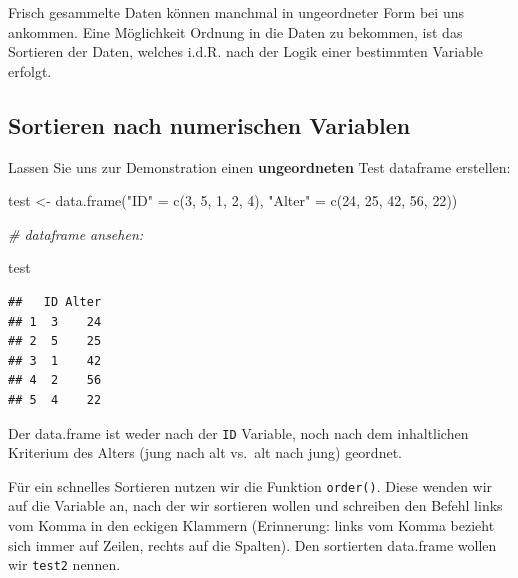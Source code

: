 \documentclass[
]{book}
\newenvironment{Shaded}{\begin{snugshade}}{\end{snugshade}}
\newcommand{\CommentTok}[1]{\textcolor[rgb]{0.56,0.35,0.01}{\textit{#1}}}
\newcommand{\DecValTok}[1]{\textcolor[rgb]{0.00,0.00,0.81}{#1}}
\newcommand{\FunctionTok}[1]{\textcolor[rgb]{0.00,0.00,0.00}{#1}}
\newcommand{\NormalTok}[1]{#1}
\newcommand{\OtherTok}[1]{\textcolor[rgb]{0.56,0.35,0.01}{#1}}
\newcommand{\SpecialCharTok}[1]{\textcolor[rgb]{0.00,0.00,0.00}{#1}}
\newcommand{\StringTok}[1]{\textcolor[rgb]{0.31,0.60,0.02}{#1}}
\begin{document}
Frisch gesammelte Daten können manchmal in ungeordneter Form bei uns ankommen. Eine Möglichkeit Ordnung in die Daten zu bekommen, ist das Sortieren der Daten, welches i.d.R. nach der Logik einer bestimmten Variable erfolgt.

\hypertarget{sortieren-nach-numerischen-variablen}{%
\subsection{Sortieren nach numerischen Variablen}\label{sortieren-nach-numerischen-variablen}}

Lassen Sie uns zur Demonstration einen \textbf{ungeordneten} Test dataframe erstellen:

\begin{Shaded}
\begin{Highlighting}[]
\NormalTok{test }\OtherTok{\textless{}{-}} \FunctionTok{data.frame}\NormalTok{(}\StringTok{"ID"} \OtherTok{=} \FunctionTok{c}\NormalTok{(}\DecValTok{3}\NormalTok{, }\DecValTok{5}\NormalTok{, }\DecValTok{1}\NormalTok{, }\DecValTok{2}\NormalTok{, }\DecValTok{4}\NormalTok{),}
                     \StringTok{"Alter"} \OtherTok{=} \FunctionTok{c}\NormalTok{(}\DecValTok{24}\NormalTok{, }\DecValTok{25}\NormalTok{, }\DecValTok{42}\NormalTok{, }\DecValTok{56}\NormalTok{, }\DecValTok{22}\NormalTok{))}

\CommentTok{\# dataframe ansehen:}

\NormalTok{test}
\end{Highlighting}
\end{Shaded}

\begin{verbatim}
##   ID Alter
## 1  3    24
## 2  5    25
## 3  1    42
## 4  2    56
## 5  4    22
\end{verbatim}

Der data.frame ist weder nach der \texttt{ID} Variable, noch nach dem inhaltlichen Kriterium des Alters (jung nach alt vs.~alt nach jung) geordnet.

Für ein schnelles Sortieren nutzen wir die Funktion \texttt{order()}. Diese wenden wir auf die Variable an, nach der wir sortieren wollen und schreiben den Befehl links vom Komma in den eckigen Klammern (Erinnerung: links vom Komma bezieht sich immer auf Zeilen, rechts auf die Spalten). Den sortierten data.frame wollen wir \texttt{test2} nennen.

\begin{Shaded}
\end{Shaded}
\end{document}
